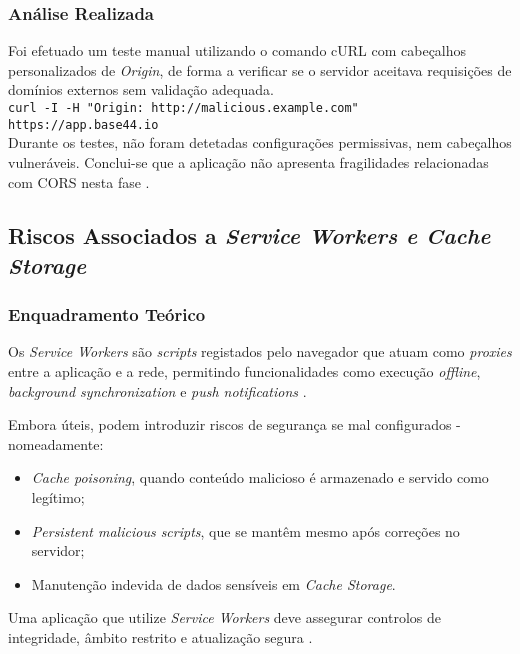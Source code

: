 \subsubsection{Análise Realizada}

Foi efetuado um teste manual utilizando o comando cURL com cabeçalhos personalizados de \textit{Origin}, de forma a verificar se o servidor aceitava requisições de domínios externos sem validação adequada.\\

\verb!curl -I -H "Origin: http://malicious.example.com" https://app.base44.io!\\

Durante os testes, não foram detetadas configurações permissivas, nem cabeçalhos vulneráveis. Conclui-se que a aplicação não apresenta fragilidades relacionadas com CORS nesta fase \cite{ref7}.

\subsection{Riscos Associados a \textit{Service Workers e Cache Storage}}

\subsubsection{Enquadramento Teórico}

Os \textit{Service Workers} são \textit{scripts} registados pelo navegador que atuam como \textit{proxies} entre a aplicação e a rede, permitindo funcionalidades como execução \textit{offline}, \textit{background synchronization} e \textit{push notifications} \cite{ref8}.

Embora úteis, podem introduzir riscos de segurança se mal configurados - nomeadamente:

\begin{itemize}

\item \textit{Cache poisoning}, quando conteúdo malicioso é armazenado e servido como legítimo;

\item \textit{Persistent malicious scripts}, que se mantêm mesmo após correções no servidor;

\item Manutenção indevida de dados sensíveis em \textit{Cache Storage}.

\end{itemize}

Uma aplicação que utilize \textit{Service Workers} deve assegurar controlos de integridade, âmbito restrito e atualização segura \cite{ref9}.

